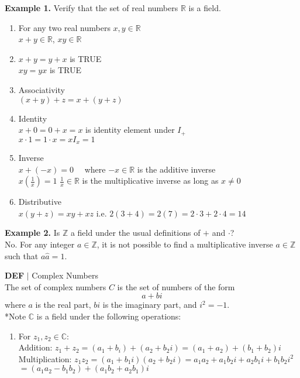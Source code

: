 \documentclass [12pt]{article}
\begin{document}
\noindent\textbf{Example 1.} Verify that the set of real numbers $\mathbb{R}$ is a field.\\
\begin{enumerate}[\quad(i)]
    \item For any two real numbers $x,y\in\mathbb{R}$\\
    \quad $x+y\in\mathbb{R}$, $xy\in\mathbb{R}$
    \item $x+y = y+x$ is TRUE\\
    \quad$xy = yx$ is TRUE
    \item Associativity\\
    \quad $(x+y) + z = x+(y + z)$
    \item Identity\\
    \quad $x+0=0+x=x$  is identity element under $I_+$\\
    \quad $x\cdot 1=1\cdot x=x$\quad $I_x = 1$
    \item Inverse\\
    \quad $x+(-x)=0\quad$ where $-x\in\mathbb{R}$ is the additive inverse\\
    \quad $x(\frac{1}{x}) = 1$ \quad $\frac{1}{x}\in\mathbb{R}$ is the multiplicative inverse as long as $x\neq 0$
    \item Distributive\\
    \quad $x(y+z) = xy+xz$ \quad i.e. $2(3+4) = 2(7) = 2\cdot3 + 2\cdot4 = 14$
\end{enumerate}
\vspace{0.2in}
\noindent\textbf{Example 2.} Is $\mathbb{Z}$ a field under the usual definitions of $+$ and $\cdot$?\\
\indent No. For any integer $a\in\mathbb{Z}$, it is not possible to find a multiplicative inverse $a \in\mathbb{Z}$ such that $a\hat{a} = 1$.
\vspace{0.2in}
\begin{framed}
\textbf{DEF} $|$ Complex Numbers\\
The set of complex numbers $C$ is the set of numbers of the form 
\[a+bi\]
where $a$ is the real part, $bi$ is the imaginary part, and $i^2=-1$.\\
*Note $\mathbb{C}$ is a field under the following operations:\\
\begin{enumerate}[\quad]
    \item For $z_1,z_2\in\mathbb{C}$:\\
    \quad Addition: $z_1+z_2 = (a_1+b_i) + (a_2+b_2i) = (a_1+a_2) + (b_1+b_2)i$\\
    \quad Multiplication: $z_1z_2=(a_1+b_1i)(a_2+b_2i)=a_1a_2+a_1b_2i+a_2b_1i+b_1b_2i^2$\\
    \quad $= (a_1a_2 - b_1b_2) + (a_1b_2+a_2b_1)i$
\end{enumerate}
\end{framed}
\end{document}
